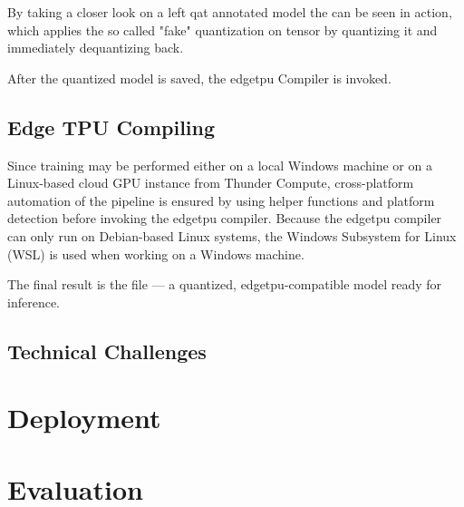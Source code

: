 {By taking a closer look on a left \gls{qat} annotated model the  can be seen in action,
which applies the so called "fake" quantization on  tensor by quantizing it and immediately dequantizing back.


After the quantized model is saved, the \gls{edgetpu} Compiler is invoked.

\subsection*{Edge TPU Compiling}

Since training may be performed either on a local Windows machine or on a Linux-based cloud GPU instance from Thunder Compute,
cross-platform automation of the pipeline is ensured by using helper functions and platform detection before invoking the \gls{edgetpu} compiler.
Because the \gls{edgetpu} compiler can only run on Debian-based Linux systems, the Windows Subsystem for Linux (WSL) is used when working on a Windows machine.

The final result is the  file --- a quantized, \gls{edgetpu}-compatible model ready for inference.

\subsection*{Technical Challenges}




\section{Deployment}
\label{sec:deployment}



\section{Evaluation}


}
